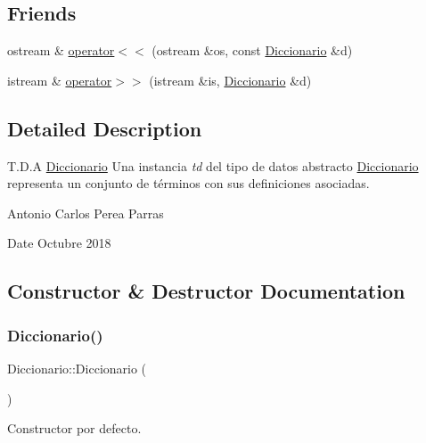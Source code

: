 \subsection*{Friends}
\begin{DoxyCompactItemize}
\item 
ostream \& \mbox{\hyperlink{class_diccionario_a3d353aed1ab1b515fcf2be6172123b1e}{operator$<$$<$}} (ostream \&os, const \mbox{\hyperlink{class_diccionario}{Diccionario}} \&d)
\item 
istream \& \mbox{\hyperlink{class_diccionario_a37fecf9dd09405cc2cc91e81bf32cab0}{operator$>$$>$}} (istream \&is, \mbox{\hyperlink{class_diccionario}{Diccionario}} \&d)
\end{DoxyCompactItemize}


\subsection{Detailed Description}
T.\+D.\+A \mbox{\hyperlink{class_diccionario}{Diccionario}} Una instancia {\itshape td} del tipo de datos abstracto {\ttfamily \mbox{\hyperlink{class_diccionario}{Diccionario}}} representa un conjunto de términos con sus definiciones asociadas. 

Antonio Carlos Perea Parras \begin{DoxyDate}{Date}
Octubre 2018 
\end{DoxyDate}


\subsection{Constructor \& Destructor Documentation}
\mbox{\label{class_diccionario_aa0a2191ec706b256c35b5229cc197b15}} 
\subsubsection{\texorpdfstring{Diccionario()}{Diccionario()}\hspace{0.1cm}{\footnotesize\ttfamily [1/3]}}
{\footnotesize\ttfamily Diccionario\+::\+Diccionario (\begin{DoxyParamCaption}{ }\end{DoxyParamCaption})}



Constructor por defecto. 

\mbox{\label{class_diccionario_aef379e39fd3f807873185ada93bb35cb}} 
